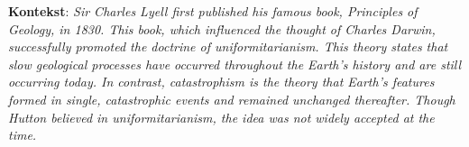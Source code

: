 


\vspace{.3cm}

\noindent
\textbf{Kontekst}:
\textit{Sir Charles Lyell first published his famous book, Principles of Geology, in 1830. This book, which influenced the thought of Charles Darwin, successfully promoted the doctrine of uniformitarianism. This theory states that slow geological processes have occurred throughout the Earth's history and are still occurring today. In contrast, catastrophism is the theory that Earth's features formed in single, catastrophic events and remained unchanged thereafter. Though Hutton believed in uniformitarianism, the idea was not widely accepted at the time.}

